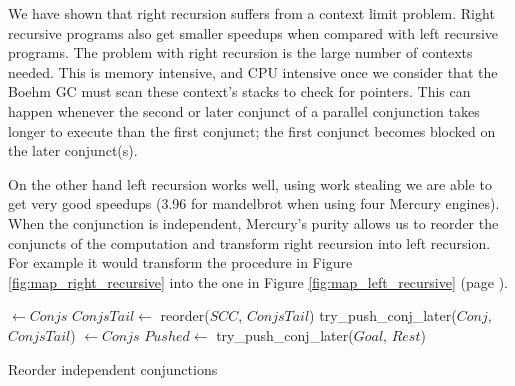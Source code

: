 

We have shown that right recursion suffers from a context limit problem.
Right recursive programs also get smaller speedups when compared with left
recursive programs.
The problem with right recursion is the large number of contexts needed.
This is memory intensive, and CPU intensive once we consider that
the Boehm GC must scan these context's stacks to check for pointers.
This can happen whenever the second or later
conjunct of a parallel conjunction
takes longer to execute than the first conjunct;
the first conjunct becomes blocked on the later conjunct(s).

On the other hand left recursion works well,
using work stealing we are able to get very good speedups (3.96 for
mandelbrot when using four Mercury engines).
When the conjunction is independent,
Mercury's purity allows us to reorder the conjuncts of the computation and
transform right recursion into left recursion.
For example it would transform the procedure in Figure
\ref{fig:map_right_recursive} into the one in Figure
\ref{fig:map_left_recursive} (page \pageref{fig:map_right_recursive}).

\begin{algorithm}
\begin{algorithmic}[1]
        \State \Return \nil
    \Else
        \State {} $\gets Conjs$
        \State $ConjsTail \gets$ reorder($SCC$, $ConjsTail$)
            \State \Return {}
        \Else
            \State \Return try\_push\_conj\_later($Conj$, $ConjsTail$)
        \EndIf
    \EndIf
\EndProcedure
{}
        \State \Return {}
    \Else
        \State {} $\gets Conjs$
            \State $Pushed \gets$ try\_push\_conj\_later($Goal$, $Rest$)
            \State \Return {}
        \Else
            \State \Return {}
        \EndIf
    \EndIf
\EndProcedure
\end{algorithmic}
\caption{Reorder independent conjunctions}
\label{alg:reorder_conjunction}
\end{algorithm}

